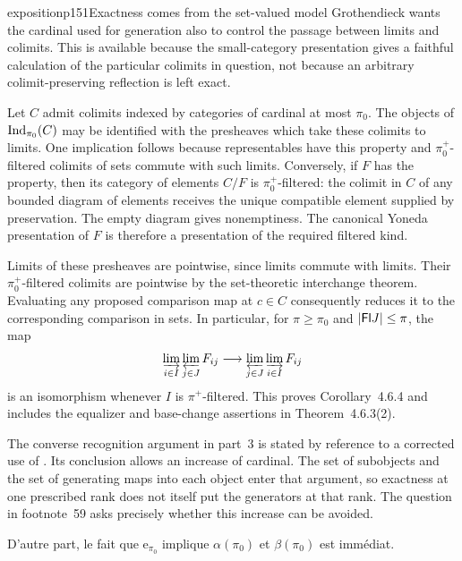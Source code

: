 \begin{dcomment}{exposition}{p151}{Exactness comes from the set-valued model}
Grothendieck wants the cardinal used for generation also to control the passage between limits and colimits. This is available because the small-category presentation gives a faithful calculation of the particular colimits in question, not because an arbitrary colimit-preserving reflection is left exact.

Let $C$ admit colimits indexed by categories of cardinal at most $\pi_0$. The objects of $\operatorname{Ind}_{\pi_0}(C)$ may be identified with the presheaves which take these colimits to limits. One implication follows because representables have this property and $\pi_0^+$-filtered colimits of sets commute with such limits. Conversely, if $F$ has the property, then its category of elements $C/F$ is $\pi_0^+$-filtered: the colimit in $C$ of any bounded diagram of elements receives the unique compatible element supplied by preservation. The empty diagram gives nonemptiness. The canonical Yoneda presentation of $F$ is therefore a presentation of the required filtered kind.

Limits of these presheaves are pointwise, since limits commute with limits. Their $\pi_0^+$-filtered colimits are pointwise by the set-theoretic interchange theorem. Evaluating any proposed comparison map at $c\in C$ consequently reduces it to the corresponding comparison in sets. In particular, for $\pi\geq\pi_0$ and $|\mathsf{Fl} J|\leq\pi$, the map
\[
 \varinjlim_{i\in I}\varprojlim_{j\in J}F_{ij}
 \longrightarrow
 \varprojlim_{j\in J}\varinjlim_{i\in I}F_{ij}
\]
is an isomorphism whenever $I$ is $\pi^+$-filtered. This proves Corollary~4.6.4 and includes the equalizer and base-change assertions in Theorem~4.6.3(2).

The converse recognition argument in part~3 is stated by reference to a corrected use of \citet[Expos\'e~I, Proposition~9.11]{SGA4I1972}. Its conclusion allows an increase of cardinal. The set of subobjects and the set of generating maps into each object enter that argument, so exactness at one prescribed rank does not itself put the generators at that rank. The question in footnote~59 asks precisely whether this increase can be avoided.
\end{dcomment}


D'autre part, le fait que $\mathrm{e}_{\pi_0}$ implique $\alpha(\pi_0)$ et $\beta(\pi_0)$ est immédiat.

